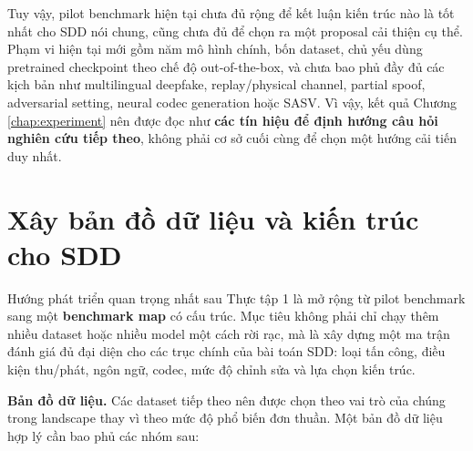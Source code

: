 Tuy vậy, pilot benchmark hiện tại chưa đủ rộng để kết luận kiến trúc nào là tốt nhất cho SDD nói chung, cũng chưa đủ để chọn ra một proposal cải thiện cụ thể. Phạm vi hiện tại mới gồm năm mô hình chính, bốn dataset, chủ yếu dùng pretrained checkpoint theo chế độ out-of-the-box, và chưa bao phủ đầy đủ các kịch bản như multilingual deepfake, replay/physical channel, partial spoof, adversarial setting, neural codec generation hoặc SASV. Vì vậy, kết quả Chương \ref{chap:experiment} nên được đọc như \textbf{các tín hiệu để định hướng câu hỏi nghiên cứu tiếp theo}, không phải cơ sở cuối cùng để chọn một hướng cải tiến duy nhất.

\section{Xây bản đồ dữ liệu và kiến trúc cho SDD}

Hướng phát triển quan trọng nhất sau Thực tập 1 là mở rộng từ pilot benchmark sang một \textbf{benchmark map} có cấu trúc. Mục tiêu không phải chỉ chạy thêm nhiều dataset hoặc nhiều model một cách rời rạc, mà là xây dựng một ma trận đánh giá đủ đại diện cho các trục chính của bài toán SDD: loại tấn công, điều kiện thu/phát, ngôn ngữ, codec, mức độ chỉnh sửa và lựa chọn kiến trúc.

\textbf{Bản đồ dữ liệu.} Các dataset tiếp theo nên được chọn theo vai trò của chúng trong landscape thay vì theo mức độ phổ biến đơn thuần. Một bản đồ dữ liệu hợp lý cần bao phủ các nhóm sau:

